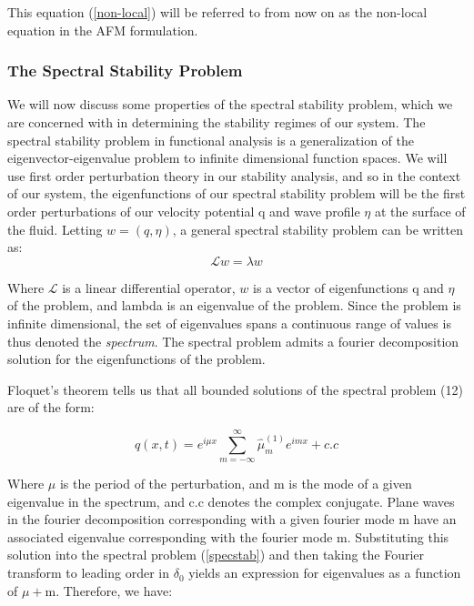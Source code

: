 \documentclass{article}
\begin{document}
\vspace{10}

This equation (\ref{non-local}) will be referred to from now on as the non-local equation in the AFM formulation. \\
\vspace{5}

\subsubsection{The Spectral Stability Problem}

We will now discuss some properties of the spectral stability problem, which we are concerned with in determining the stability regimes of our system. The spectral stability problem in functional analysis is a generalization of the eigenvector-eigenvalue problem to infinite dimensional function spaces. We will use first order perturbation theory in our stability analysis, and so in the context of our system, the eigenfunctions of our spectral stability problem will be the first order perturbations of our velocity potential q and wave profile \(\eta\) at the surface of the fluid. Letting \(w = (q,\eta)\), a general spectral stability problem can be written as:\\


\begin{equation} \label{specstab}
 \mathscr{L}w = \lambda w
\end{equation}

Where \(\mathscr{L}\) is a linear differential operator, \(w\) is a vector of eigenfunctions q and \(\eta\) of the problem, and lambda is an eigenvalue of the problem. Since the problem is infinite dimensional, the set of eigenvalues spans a continuous range of values is thus denoted the \emph{spectrum}. The spectral problem admits a fourier decomposition solution for the eigenfunctions of the problem. \\

\vspace{15} 

Floquet's theorem tells us that all bounded solutions of the spectral problem (12) are of the form: 

\begin{equation} \label{floquet}
  q(x,t) = e^{i\mu x} \sum_{m=-\infty}^{\infty} \hat\mu^{(1)}_m e^{imx} + c.c
\end{equation}

Where \(\mu\) is the period of the perturbation, and m is the mode of a given eigenvalue in the spectrum, and c.c denotes the complex conjugate. Plane waves in the fourier decomposition corresponding with a given fourier mode m have an associated eigenvalue corresponding with the fourier mode m.  Substituting this solution into the spectral problem (\ref{specstab}) and then taking the Fourier transform to leading order in \(\delta_0\) yields an expression for eigenvalues as a function of \(\mu +\)m. Therefore, we have:
\end{document}
